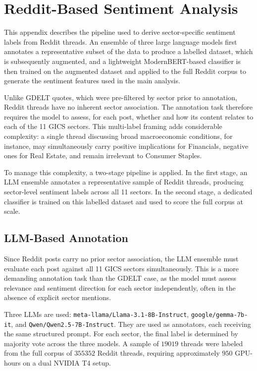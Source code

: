 \chapter{Reddit-Based Sentiment Analysis}
\label{chap:sentiment_reddit}

\begin{introduction}
This appendix describes the pipeline used to derive sector-specific sentiment labels from Reddit threads. An ensemble of three large language models first annotates a representative subset of the data to produce a labelled dataset, which is subsequently augmented, and a lightweight ModernBERT-based classifier is then trained on the augmented dataset and applied to the full Reddit corpus to generate the sentiment features used in the main analysis.
\end{introduction}

Unlike GDELT quotes, which were pre-filtered by sector prior to annotation, Reddit threads have no inherent sector association. The annotation task therefore requires the model to assess, for each post, whether and how its content relates to each of the 11 GICS sectors. This multi-label framing adds considerable complexity: a single thread discussing broad macroeconomic conditions, for instance, may simultaneously carry positive implications for Financials, negative ones for Real Estate, and remain irrelevant to Consumer Staples.

To manage this complexity, a two-stage pipeline is applied. In the first stage, an LLM ensemble annotates a representative sample of Reddit threads, producing sector-level sentiment labels across all 11 sectors. In the second stage, a dedicated classifier is trained on this labelled dataset and used to score the full corpus at scale.

\section{LLM-Based Annotation}
\label{sec:redditllm_annotation}

Since Reddit posts carry no prior sector association, the LLM ensemble must evaluate each post against all 11 GICS sectors simultaneously. This is a more demanding annotation task than the GDELT case, as the model must assess relevance and sentiment direction for each sector independently, often in the absence of explicit sector mentions.

Three LLMs are used: \texttt{meta-llama/Llama-3.1-8B-Instruct}, \texttt{google/gemma-7b-it}, and \texttt{Qwen/Qwen2.5-7B-Instruct}. They are used as annotators, each receiving the same structured prompt. For each sector, the final label is determined by majority vote across the three models. A sample of $\num{19019}$ threads were labeled from the full corpus of $\num{355352}$ Reddit threads, requiring approximately $\num{950}$ GPU-hours on a dual NVIDIA T4 setup. 


